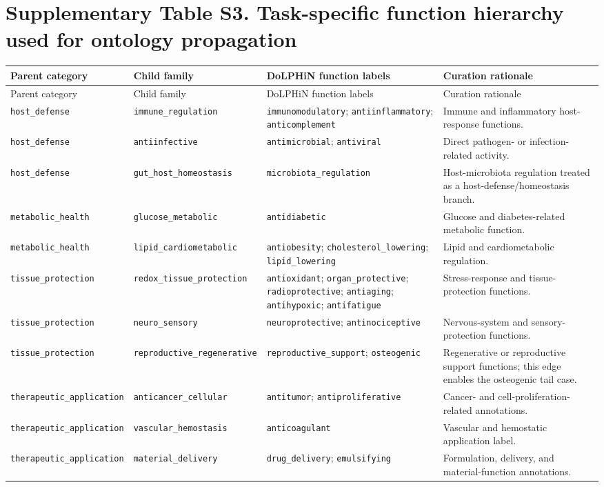 \documentclass[11pt]{article}
\begin{document}
\section*{Supplementary Table S3. Task-specific function hierarchy used for ontology propagation}
\scriptsize
\begin{longtable}{>{\raggedright\arraybackslash}p{2.0cm}>{\raggedright\arraybackslash}p{2.2cm}>{\raggedright\arraybackslash}p{4.1cm}>{\raggedright\arraybackslash}p{5.0cm}}
\toprule
Parent category & Child family & DoLPHiN function labels & Curation rationale \\
\midrule
\endfirsthead
\toprule
Parent category & Child family & DoLPHiN function labels & Curation rationale \\
\midrule
\endhead
\texttt{host\_defense} & \texttt{immune\_regulation} & \texttt{immunomodulatory}; \texttt{antiinflammatory}; \texttt{anticomplement} & Immune and inflammatory host-response functions. \\
\texttt{host\_defense} & \texttt{antiinfective} & \texttt{antimicrobial}; \texttt{antiviral} & Direct pathogen- or infection-related activity. \\
\texttt{host\_defense} & \texttt{gut\_host\_homeostasis} & \texttt{microbiota\_regulation} & Host-microbiota regulation treated as a host-defense/homeostasis branch. \\
\texttt{metabolic\_health} & \texttt{glucose\_metabolic} & \texttt{antidiabetic} & Glucose and diabetes-related metabolic function. \\
\texttt{metabolic\_health} & \texttt{lipid\_cardiometabolic} & \texttt{antiobesity}; \texttt{cholesterol\_lowering}; \texttt{lipid\_lowering} & Lipid and cardiometabolic regulation. \\
\texttt{tissue\_protection} & \texttt{redox\_tissue\_protection} & \texttt{antioxidant}; \texttt{organ\_protective}; \texttt{radioprotective}; \texttt{antiaging}; \texttt{antihypoxic}; \texttt{antifatigue} & Stress-response and tissue-protection functions. \\
\texttt{tissue\_protection} & \texttt{neuro\_sensory} & \texttt{neuroprotective}; \texttt{antinociceptive} & Nervous-system and sensory-protection functions. \\
\texttt{tissue\_protection} & \texttt{reproductive\_regenerative} & \texttt{reproductive\_support}; \texttt{osteogenic} & Regenerative or reproductive support functions; this edge enables the osteogenic tail case. \\
\texttt{therapeutic\_application} & \texttt{anticancer\_cellular} & \texttt{antitumor}; \texttt{antiproliferative} & Cancer- and cell-proliferation-related annotations. \\
\texttt{therapeutic\_application} & \texttt{vascular\_hemostasis} & \texttt{anticoagulant} & Vascular and hemostatic application label. \\
\texttt{therapeutic\_application} & \texttt{material\_delivery} & \texttt{drug\_delivery}; \texttt{emulsifying} & Formulation, delivery, and material-function annotations. \\
\bottomrule
\end{longtable}
\normalsize
\end{document}
